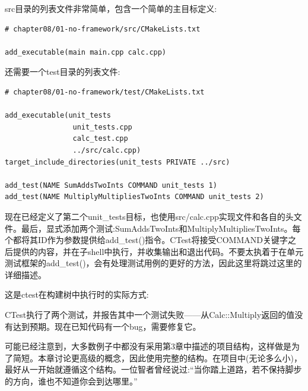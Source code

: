 src目录的列表文件非常简单，包含一个简单的主目标定义:

\begin{lstlisting}[style=styleCMake]
# chapter08/01-no-framework/src/CMakeLists.txt

add_executable(main main.cpp calc.cpp)
\end{lstlisting} 

还需要一个test目录的列表文件:

\begin{lstlisting}[style=styleCMake]
# chapter08/01-no-framework/test/CMakeLists.txt

add_executable(unit_tests
				unit_tests.cpp
				calc_test.cpp
				../src/calc.cpp)
target_include_directories(unit_tests PRIVATE ../src)

add_test(NAME SumAddsTwoInts COMMAND unit_tests 1)
add_test(NAME MultiplyMultipliesTwoInts COMMAND unit_tests 2)
\end{lstlisting} 

现在已经定义了第二个unit\_tests目标，也使用src/calc.cpp实现文件和各自的头文件。最后，显式添加两个测试:SumAddsTwoInts和MultiplyMultipliesTwoInts。每个都将其ID作为参数提供给add\_test()指令。CTest将接受COMMAND关键字之后提供的内容，并在子shell中执行，并收集输出和退出代码。不要太执着于在单元测试框架的add\_test()，会有处理测试用例的更好的方法，因此这里将跳过这里的详细描述。

这是ctest在构建树中执行时的实际方式:


CTest执行了两个测试，并报告其中一个测试失败——从Calc::Multiply返回的值没有达到预期。现在已知代码有一个bug，需要修复它。

\begin{tcolorbox}[colback=blue!5!white,colframe=blue!75!black,title=Note]
可能已经注意到，大多数例子中都没有采用第3章中描述的项目结构，这样做是为了简短。本章讨论更高级的概念，因此使用完整的结构。在项目中(无论多么小)，最好从一开始就遵循这个结构。一位智者曾经说过:“当你踏上道路，若不保持脚步的方向，谁也不知道你会到达哪里。”
\end{tcolorbox}

